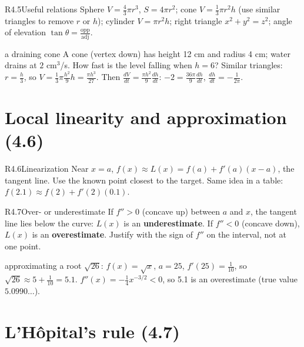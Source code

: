 \documentclass{apcalc}
\begin{document}
\begin{rulebox}{R4.5}{Useful relations}
Sphere $V=\frac43\pi r^3$, $S=4\pi r^2$; cone $V=\frac13\pi r^2h$ (use similar triangles to remove $r$ or $h$); cylinder $V=\pi r^2h$; right triangle $x^2+y^2=z^2$; angle of elevation $\tan\theta=\frac{\text{opp}}{\text{adj}}$.
\end{rulebox}

\begin{example}{a draining cone}
A cone (vertex down) has height 12 cm and radius 4 cm; water drains at $2$ cm$^3$/s. How fast is the level falling when $h=6$? Similar triangles: $r=\frac h3$, so $V=\frac13\pi\frac{h^2}{9}h=\frac{\pi h^3}{27}$. Then $\frac{dV}{dt}=\frac{\pi h^2}{9}\frac{dh}{dt}$: $-2=\frac{36\pi}{9}\frac{dh}{dt}$, $\frac{dh}{dt}=-\frac{1}{2\pi}$. 
\end{example}

\section{Local linearity and approximation (4.6)}

\begin{rulebox}{R4.6}{Linearization}
Near $x=a$, $f(x)\approx L(x)=f(a)+f'(a)(x-a)$, the tangent line. Use the known point closest to the target. Same idea in a table: $f(2.1)\approx f(2)+f'(2)(0.1)$.
\end{rulebox}

\begin{rulebox}{R4.7}{Over- or underestimate}
If $f''>0$ (concave up) between $a$ and $x$, the tangent line lies below the curve: $L(x)$ is an \textbf{underestimate}. If $f''<0$ (concave down), $L(x)$ is an \textbf{overestimate}. Justify with the sign of $f''$ on the interval, not at one point.
\end{rulebox}

\begin{example}{approximating a root}
$\sqrt{26}$: $f(x)=\sqrt x$, $a=25$, $f'(25)=\frac1{10}$, so $\sqrt{26}\approx5+\frac{1}{10}=5.1$. $f''(x)=-\frac14x^{-3/2}<0$, so 5.1 is an overestimate (true value $5.0990\ldots$). 
\end{example}

\section{L'H\^opital's rule (4.7)}
\end{document}
